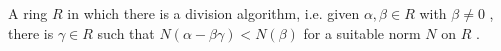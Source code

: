 A ring  $ R $  in which there is a  division
algorithm, i.e.  given  $  \alpha , \beta  \in R $  with  $  \beta  \neq 0 $ ,
there is  $  \gamma  \in R $  such that  $ N( \alpha - \beta  \gamma)<N( \beta ) $ 
for a suitable  norm  $ N $  on  $ R $ .

